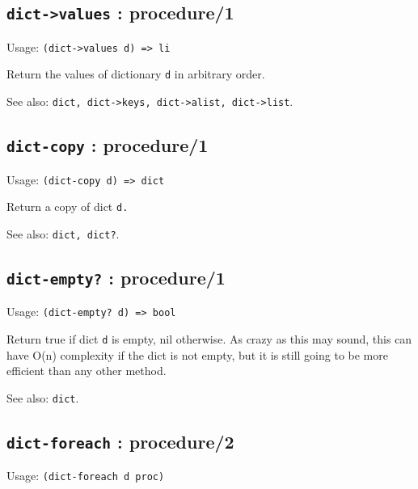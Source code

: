 \documentclass[
]{article}
\newcommand{\passthrough}[1]{#1}
\begin{document}
\hypertarget{dict-values-procedure1-1}{%
\subsection{\texorpdfstring{\texttt{dict-\textgreater{}values} :
procedure/1}{dict-\textgreater values : procedure/1}}\label{dict-values-procedure1-1}}

Usage: \passthrough{\lstinline!(dict->values d) => li!}

Return the values of dictionary \passthrough{\lstinline!d!} in arbitrary
order.

See also:
\passthrough{\lstinline!dict, dict->keys, dict->alist, dict->list!}.

\hypertarget{dict-copy-procedure1-1}{%
\subsection{\texorpdfstring{\texttt{dict-copy} :
procedure/1}{dict-copy : procedure/1}}\label{dict-copy-procedure1-1}}

Usage: \passthrough{\lstinline!(dict-copy d) => dict!}

Return a copy of dict \passthrough{\lstinline!d.!}

See also: \passthrough{\lstinline!dict, dict?!}.

\hypertarget{dict-empty-procedure1-1}{%
\subsection{\texorpdfstring{\texttt{dict-empty?} :
procedure/1}{dict-empty? : procedure/1}}\label{dict-empty-procedure1-1}}

Usage: \passthrough{\lstinline!(dict-empty? d) => bool!}

Return true if dict \passthrough{\lstinline!d!} is empty, nil otherwise.
As crazy as this may sound, this can have O(n) complexity if the dict is
not empty, but it is still going to be more efficient than any other
method.

See also: \passthrough{\lstinline!dict!}.

\hypertarget{dict-foreach-procedure2-1}{%
\subsection{\texorpdfstring{\texttt{dict-foreach} :
procedure/2}{dict-foreach : procedure/2}}\label{dict-foreach-procedure2-1}}

Usage: \passthrough{\lstinline!(dict-foreach d proc)!}
\end{document}
